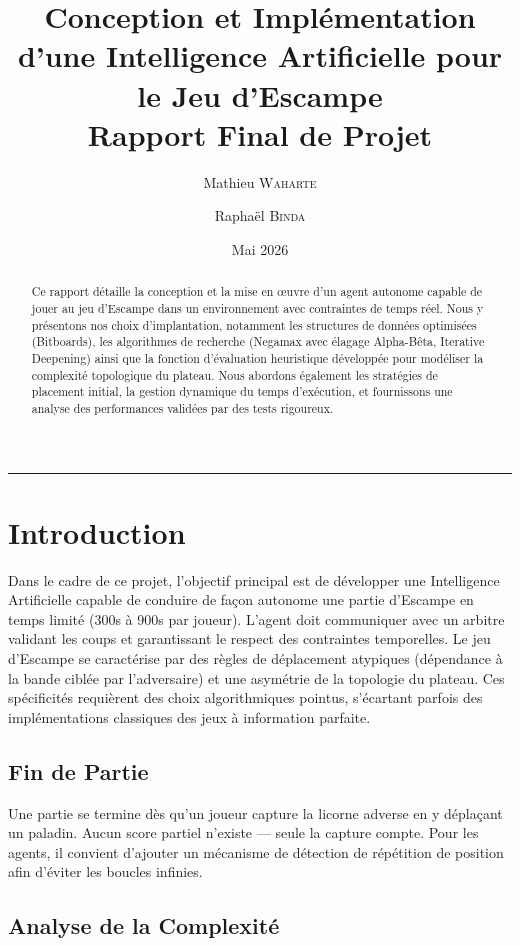 \documentclass[12pt,a4paper]{article}
\title{
  \Large \textbf{Conception et Implémentation d'une Intelligence Artificielle pour le Jeu d'Escampe}\\[0.4em]
  \large Rapport Final de Projet
}
\author{
  Mathieu \textsc{Waharte} \and Raphaël \textsc{Binda}
}
\date{Mai 2026}
\begin{document}
\maketitle
\thispagestyle{fancy}

\begin{abstract}
Ce rapport détaille la conception et la mise en œuvre d'un agent autonome capable de jouer au jeu d'Escampe dans un environnement avec contraintes de temps réel. Nous y présentons nos choix d'implantation, notamment les structures de données optimisées (Bitboards), les algorithmes de recherche (Negamax avec élagage Alpha-Bêta, Iterative Deepening) ainsi que la fonction d'évaluation heuristique développée pour modéliser la complexité topologique du plateau. Nous abordons également les stratégies de placement initial, la gestion dynamique du temps d'exécution, et fournissons une analyse des performances validées par des tests rigoureux.
\end{abstract}

\vspace{0.5em}
\noindent\rule{\linewidth}{0.4pt}
\tableofcontents
\vspace{1em}

\newpage
\section{Introduction}
Dans le cadre de ce projet, l'objectif principal est de développer une Intelligence Artificielle capable de conduire de façon autonome une partie d'Escampe en temps limité (300s à 900s par joueur). L'agent doit communiquer avec un arbitre validant les coups et garantissant le respect des contraintes temporelles.
Le jeu d'Escampe se caractérise par des règles de déplacement atypiques (dépendance à la bande ciblée par l'adversaire) et une asymétrie de la topologie du plateau. Ces spécificités requièrent des choix algorithmiques pointus, s'écartant parfois des implémentations classiques des jeux à information parfaite.

\subsection{Fin de Partie}
Une partie se termine dès qu'un joueur capture la licorne adverse en y déplaçant un paladin. Aucun score partiel n'existe — seule la capture compte. Pour les agents, il convient d'ajouter un mécanisme de détection de répétition de position afin d'éviter les boucles infinies.

\subsection{Analyse de la Complexité}
\end{document}
